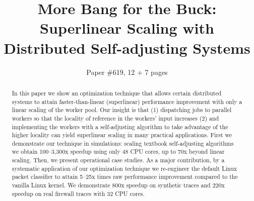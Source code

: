 \documentclass[letterpaper,twocolumn,10pt]{article}
\begin{document}


\title{More Bang for the Buck: 
Superlinear Scaling with Distributed Self-adjusting Systems}

\author{Paper \#619, 12 + 7 pages}

\maketitle

\begin{abstract}
  In this paper we show an optimization technique that allows certain distributed systems to attain faster-than-linear (superlinear) performance improvement with only a linear scaling of the worker pool. Our insight is that (1) dispatching jobs to parallel workers so that the locality of reference in the workers' input increases (2) and implementing the workers with a self-adjusting algorithm to take advantage of the higher locality can yield superlinear scaling in many practical applications. First we demonstrate our technique in simulations: scaling textbook self-adjusting algorithms we obtain 100--3,300x speedup using only 48 CPU cores, up to 70x beyond linear scaling. Then, we present operational case studies. As a major contribution, by a systematic application of our optimization technique we re-engineer the default Linux packet classifier to attain 5--25x times raw performance improvement compared to the vanilla Linux kernel. We demonstrate 800x speedup on synthetic traces and 220x speedup on real firewall traces with 32 CPU cores.
\end{abstract}


  












% 

 
\begin{small}

\end{small}

\begin{appendices}



\end{appendices}
\end{document}
